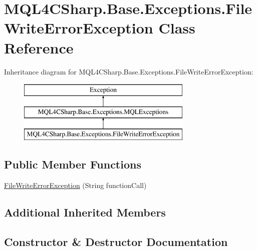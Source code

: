 \hypertarget{class_m_q_l4_c_sharp_1_1_base_1_1_exceptions_1_1_file_write_error_exception}{}\section{M\+Q\+L4\+C\+Sharp.\+Base.\+Exceptions.\+File\+Write\+Error\+Exception Class Reference}
\label{class_m_q_l4_c_sharp_1_1_base_1_1_exceptions_1_1_file_write_error_exception}
Inheritance diagram for M\+Q\+L4\+C\+Sharp.\+Base.\+Exceptions.\+File\+Write\+Error\+Exception\+:\begin{figure}[H]
\begin{center}
\leavevmode
\includegraphics[height=3.000000cm]{class_m_q_l4_c_sharp_1_1_base_1_1_exceptions_1_1_file_write_error_exception}
\end{center}
\end{figure}
\subsection*{Public Member Functions}
\begin{DoxyCompactItemize}
\item 
\hyperlink{class_m_q_l4_c_sharp_1_1_base_1_1_exceptions_1_1_file_write_error_exception_a41ea5c36731a4550947473307ef03f5b}{File\+Write\+Error\+Exception} (String function\+Call)
\end{DoxyCompactItemize}
\subsection*{Additional Inherited Members}


\subsection{Constructor \& Destructor Documentation}
